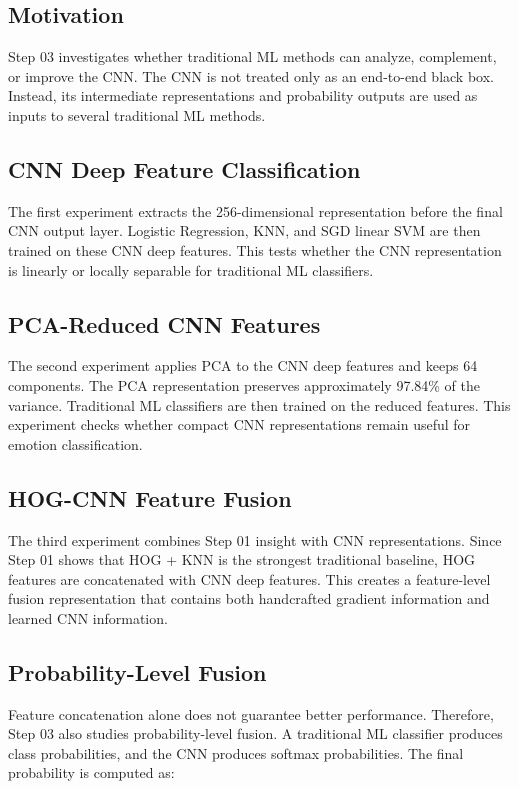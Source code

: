 \documentclass[conference]{IEEEtran}
\begin{document}
\subsection{Motivation}

Step 03 investigates whether traditional ML methods can analyze, complement,
or improve the CNN. The CNN is not treated only as an end-to-end black box.
Instead, its intermediate representations and probability outputs are used as
inputs to several traditional ML methods.

\subsection{CNN Deep Feature Classification}

The first experiment extracts the 256-dimensional representation before the
final CNN output layer. Logistic Regression, KNN, and SGD linear SVM are then
trained on these CNN deep features. This tests whether the CNN representation
is linearly or locally separable for traditional ML classifiers.

\subsection{PCA-Reduced CNN Features}

The second experiment applies PCA to the CNN deep features and keeps 64
components. The PCA representation preserves approximately 97.84\% of the
variance. Traditional ML classifiers are then trained on the reduced features.
This experiment checks whether compact CNN representations remain useful for
emotion classification.

\subsection{HOG-CNN Feature Fusion}

The third experiment combines Step 01 insight with CNN representations. Since
Step 01 shows that HOG + KNN is the strongest traditional baseline, HOG
features are concatenated with CNN deep features. This creates a feature-level
fusion representation that contains both handcrafted gradient information and
learned CNN information.

\subsection{Probability-Level Fusion}

Feature concatenation alone does not guarantee better performance. Therefore,
Step 03 also studies probability-level fusion. A traditional ML classifier
produces class probabilities, and the CNN produces softmax probabilities. The
final probability is computed as:
\end{document}
